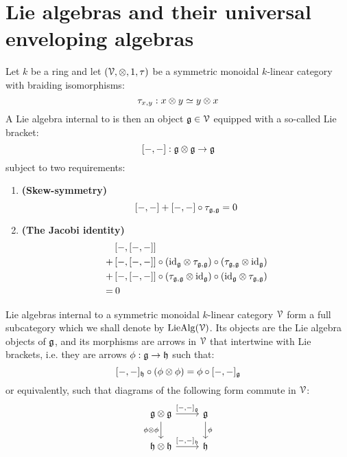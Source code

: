 \section{Lie algebras and their universal enveloping algebras}
    \begin{definition} \label{def: lie_algebras}
        Let $k$ be a ring and let $(\calV, \tensor, 1, \tau)$ be a symmetric monoidal $k$-linear category with braiding isomorphisms:
            $$\tau_{x, y}: x \tensor y \cong y \tensor x$$
        A Lie algebra internal to is then an object $\mathfrak{g} \in \mathcal{V}$ equipped with a so-called Lie bracket:
            $$[-,-]: \g \tensor \g \to \g$$
        subject to two requirements:
            \begin{enumerate}
                \item \textbf{(Skew-symmetry)}
                    $$[-,-] + [-,-] \circ \tau_{\mathfrak{g}, \mathfrak{g}} = 0$$
                \item \textbf{(The Jacobi identity)}
                    $$
                        \begin{aligned}
                            & \left[-, [-,-]\right]
                            \\
                            + & \left[-, [-,-]\right] \circ \left(\id_{\g} \tensor \tau_{\g, \g}\right) \circ \left(\tau_{\g, \g} \tensor \id_{\g}\right)
                            \\
                            + & \left[-, [-,-]\right] \circ \left(\tau_{\g, \g} \tensor \id_{\g}\right) \circ \left(\id_{\g} \tensor \tau_{\g, \g}\right)
                            \\
                            = & \: 0
                        \end{aligned}
                    $$
            \end{enumerate}
        Lie algebras internal to a symmetric monoidal $k$-linear category $\mathcal{V}$ form a full subcategory which we shall denote by $\mathrm{Lie}\mathrm{Alg}(\mathcal{V})$. Its objects are the Lie algebra objects of $\mathfrak{g}$, and its morphisms are arrows in $\mathcal{V}$ that intertwine with Lie brackets, i.e. they are arrows $\phi: \mathfrak{g} \to \mathfrak{h}$ such that:
            $$[-,-]_{\h} \circ (\phi \tensor \phi) = \phi \circ [-,-]_{\g}$$
        or equivalently, such that diagrams of the following form commute in $\mathcal{V}$:
            $$
                \begin{tikzcd}
                	{\g \tensor \g} & {\g} \\
                	{\h \tensor \h} & {\h}
                	\arrow["{\phi}", from=1-2, to=2-2]
                	\arrow["{\phi \tensor \phi}"', from=1-1, to=2-1]
                	\arrow["{[-,-]_{\h}}", from=2-1, to=2-2]
                	\arrow["{[-,-]_{\g}}", from=1-1, to=1-2]
                \end{tikzcd}
            $$
    \end{definition}
    
